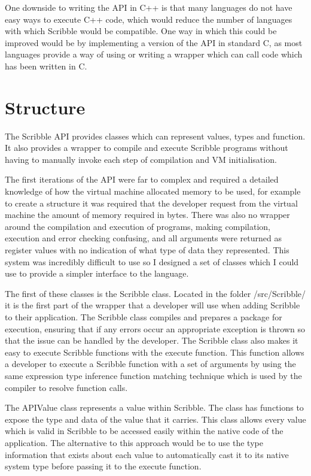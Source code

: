 \documentclass[]{final_report}
\begin{document}
One downside to writing the API in C++ is that many languages do not have easy ways to execute C++ code, which would reduce the number of languages with which Scribble would be compatible. One way in which this could be improved would be by implementing a version of the API in standard C, as most languages provide a way of using or writing a wrapper which can call code which has been written in C.

\section{Structure}

The Scribble API provides classes which can represent values, types and function. It also provides a wrapper to compile and execute Scribble programs without having to manually invoke each step of compilation and VM initialisation.

The first iterations of the API were far to complex and required a detailed knowledge of how the virtual machine allocated memory to be used, for example to create a structure it was required that the developer request from the virtual machine the amount of memory required in bytes. There was also no wrapper around the compilation and execution of programs, making compilation, execution and error checking confusing, and all arguments were returned as register values with no indication of what type of data they represented. This system was incredibly difficult to use so I designed a set of classes which I could use to provide a simpler interface to the language.

The first of these classes is the Scribble class. Located in the folder /src/Scribble/ it is the first part of the wrapper that a developer will use when adding Scribble to their application. The Scribble class compiles and prepares a package for execution, ensuring that if any errors occur an appropriate exception is thrown so that the issue can be handled by the developer. The Scribble class also makes it easy to execute Scribble functions with the execute function. This function allows a developer to execute a Scribble function with a set of arguments by using the same expression type inference function matching technique which is used by the compiler to resolve function calls.

The APIValue class represents a value within Scribble. The class has functions to expose the type and data of the value that it carries. This class allows every value which is valid in Scribble to be accessed easily within the native code of the application. The alternative to this approach would be to use the type information that exists about each value to automatically cast it to its native system type before passing it to the execute function.
\end{document}
